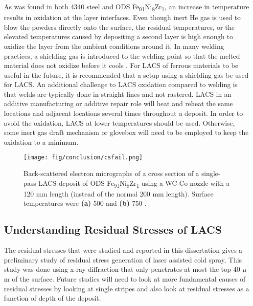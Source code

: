 		
		As was found in both 4340 steel and ODS Fe\textsubscript{91}Ni\textsubscript{8}Zr\textsubscript{1}, an increase in temperature results in oxidation at the layer interfaces. Even though inert He gas is used to blow the powders directly onto the surface, the residual temperatures, or the elevated temperatures caused by depositing a second layer is high enough to oxidize the layer from the ambient conditions around it. In many welding practices, a shielding gas is introduced to the welding point so that the melted material does not oxidize before it cools \cite{RN3361}. For LACS of ferrous materials to be useful in the future, it is recommended that a setup using a shielding gas be used for LACS. An additional challenge to LACS oxidation compared to welding is that welds are typically done in straight lines and not rastered. LACS in an additive manufacturing or additive repair role will heat and reheat the same locations and adjacent locations several times throughout a deposit. In order to avoid the oxidation, LACS at lower temperatures should be used. Otherwise, some inert gas draft mechanism or glovebox will need to be employed to keep the oxidation to a minimum.
	
		\begin{figure}
			\centering
			\texttt{[image: fig/conclusion/csfail.png]}
			\caption[Back-scattered electron micrographs of a cross section of a single-pass LACS deposit of ODS Fe\textsubscript{91}Ni\textsubscript{8}Zr\textsubscript{1} using a WC-Co nozzle with a 120 mm length (instead of the normal 200 mm length).]{Back-scattered electron micrographs of a cross section of a single-pass LACS deposit of ODS Fe\textsubscript{91}Ni\textsubscript{8}Zr\textsubscript{1} using a WC-Co nozzle with a 120 mm length (instead of the normal 200 mm length). Surface temperatures were \textbf{(a)} 500 \celsius{} and \textbf{(b)} 750 \celsius{}.}
			\label{fig:csfail}
		\end{figure}
			
	\subsection*{Understanding Residual Stresses of LACS}
		The residual stresses that were studied and reported in this dissertation gives a preliminary study of residual stress generation of laser assisted cold spray. This study was done using x-ray diffraction that only penetrates at most the top 40 $ \mu$m of the surface. Future studies will need to look at more fundamental causes of residual stresses by looking at single stripes and also look at residual stresses as a function of depth of the deposit.
		
